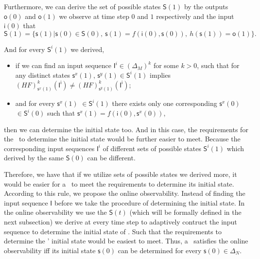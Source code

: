 Furthermore, we can derive the set of possible states $\mathsf{S}(1)$ by the outputs $\mathsf{o}(0)$ and $\mathsf{o}(1)$ we observe at time step $0$ and $1$ respectively and the input $\mathsf{i}(0)$ that
\[\mathsf{S}(1)=\{\mathsf{s}(1)|\mathsf{s}(0)\in \mathsf{S}(0),\ \mathsf{s}(1)=f({\mathsf{i}(0)},{\mathsf{s}(0)}),\ h(\mathsf{s}(1))=\mathsf{o}(1)\}.\]

And for every $\mathsf{S}^{i}(1)$ we derived, 
\begin{itemize}
  \item if we can find an input sequence $\mathsf{I}^{i}\in(\Delta_M)^k$ for some $k>0$, such that for any distinct states $\mathsf{s}^{x}(1)$, $\mathsf{s}^{y}(1) \in \mathsf{S}^{i}(1)$ implies $(HF)^k_{\mathsf{s}^{x}(1)}(\mathsf{I^i})\neq (HF)^k_{\mathsf{s}^{y}(1)}(\mathsf{I^i})$;
  \item  and for every $\mathsf{s}^{x}(1)$ $\in \mathsf{S}^{i}(1)$ there exists only one corresponding $\mathsf{s}^{x}(0)$ $\in \mathsf{S}^{i}(0)$ such that $\mathsf{s}^{x}(1)=f({\mathsf{i}(0)},{\mathsf{s}^{x}(0)})$,
\end{itemize} 
then we can determine the initial state too. And in this case, the requirements for the \BCN\ to determine the initial state would be further easier to meet. Because the corresponding input sequences $\mathsf{I}^{i}$ of different sets of possible states $\mathsf{S}^{i}(1)$ which derived by the same $\mathsf{S}(0)$ can be different. 

Therefore, we have that if we utilize sets of possible states we derived more, it would be easier for a \BCN\ to meet the requirements to determine its initial state. According to this rule, we propose the online observability. Instead of finding the input sequence $\mathsf{I}$ before we take the procedure of determining the initial state. In the online observability we use the $\mathsf{S}(t)$ (which will be formally defined in the next subsection) we derive at every time step to adaptively contruct the input sequence to determine the initial state of \BCNs. Such that the requirements to determine the \BCNs' initial state would be easiest to meet. Thus, a \BCN\ satisfies the online observability iff its initial state $\mathsf{s}(0)$ can be determined for every $\mathsf{s}(0) \in \Delta_N$.


